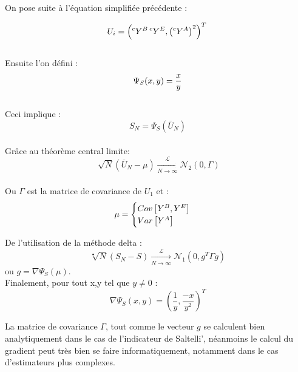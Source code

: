 \documentclass[a4paper,10pt]{article}
\begin{document}
On pose suite à l’équation simplifiée précédente :

\begin{equation}
U_{i} = \left(\prescript{c}{}{Y}^{B}\prescript{c}{}{Y}^{E},\left(\prescript{c}{}{Y}^{A}\right)^{2}\right)^{T} \\
\end{equation} \\
  
Ensuite l'on défini :
\begin{equation}
\Psi_{S}(x,y) = \frac{x}{y} \\
\end{equation} \\

Ceci implique :
\begin{equation}
S_{N} = \Psi_{S}\left(\overline{U}_{N}\right)
\end{equation} \\

Grâce au théorème central limite:
\begin{equation}
\sqrt[]{N}\left(\overline{U}_{N}-\mu\right)\xrightarrow[N\to\infty]{\mathcal{L}}\mathcal{N}_{2}\left(0,\Gamma\right) 
\end{equation}\\

Ou $\Gamma$ est la matrice de covariance de $U_{1}$ et :
\begin{equation}
\mu=
\begin{cases}
	Cov\left[Y^{B},Y^{E}\right] \\
	Var\left[Y^{A}\right]       \\
\end{cases}\\
\end{equation}

De l'utilisation de la méthode delta : 
\begin{equation}
\sqrt[•]{N}\left(S_{N}-S\right)\xrightarrow[N\to\infty]{\mathcal{L}}\mathcal{N}_{1}\left(0,g^{T}\Gamma g\right)
\end{equation}
ou $g=\nabla\Psi_{S}(\mu)$.\\ 

Finalement, pour tout x,y tel que $y \neq 0$ :
\begin{equation}
\nabla\Psi_{S}(x,y)=\left(\frac{1}{y},\frac{-x}{y^{2}}\right)^{T}
\end{equation}

La matrice de covariance $\Gamma$, tout comme le vecteur $g$ se calculent bien analytiquement dans le cas de l'indicateur de Saltelli', néanmoins le calcul du gradient peut très bien se faire informatiquement, notamment dans le cas d'estimateurs plus complexes.
\end{document}
